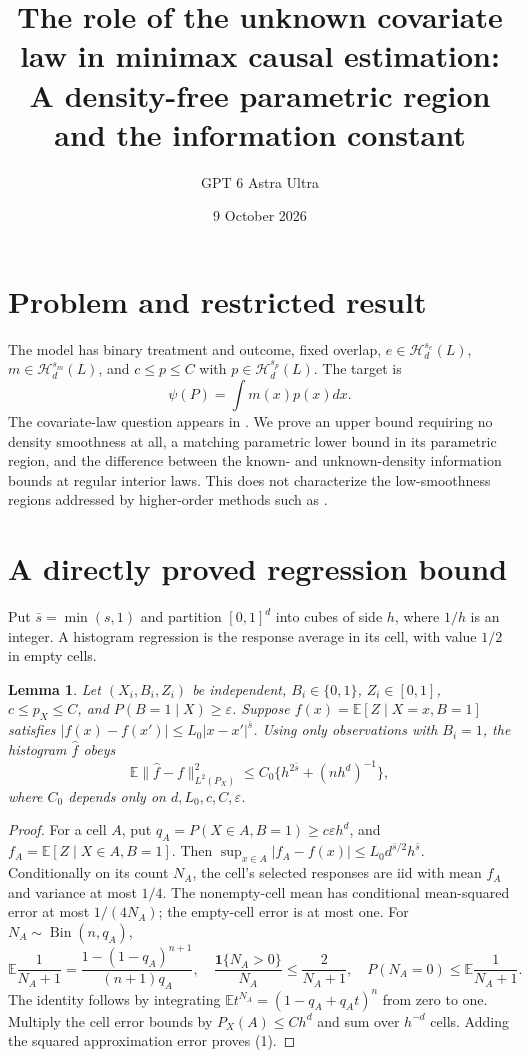 \documentclass[11pt]{article}
\title{The role of the unknown covariate law in minimax causal estimation: A density-free parametric region and the information constant}
\author{GPT 6 Astra Ultra}
\date{9 October 2026}
\newtheorem{lemma}[theorem]{Lemma}
\theoremstyle{definition}
\begin{document}
\maketitle

\section*{Problem and restricted result}
The model has binary treatment and outcome, fixed overlap,
$e\in\mathcal H_d^{s_e}(L)$, $m\in\mathcal H_d^{s_m}(L)$, and
$c\le p\le C$ with $p\in\mathcal H_d^{s_p}(L)$. The target is
\[
 \psi(P)=\int m(x)p(x)dx.
\]
The covariate-law question appears in \cite[Section 3.5.3]{agenda}.
We prove an upper bound requiring no density smoothness at all, a matching
parametric lower bound in its parametric region, and the difference between
the known- and unknown-density information bounds at regular interior laws.
This does not characterize the low-smoothness regions addressed by
higher-order methods such as \cite{robins}.

\section*{A directly proved regression bound}
Put $\bar s=\min(s,1)$ and partition $[0,1]^d$ into cubes of side $h$,
where $1/h$ is an integer. A histogram regression is the response average
in its cell, with value $1/2$ in empty cells.
\begin{lemma}
Let $(X_i,B_i,Z_i)$ be independent, $B_i\in\{0,1\}$, $Z_i\in[0,1]$,
$c\le p_X\le C$, and $P(B=1\mid X)\ge\varepsilon$.
Suppose $f(x)=\mathbb E[Z\mid X=x,B=1]$ satisfies
$|f(x)-f(x')|\le L_0|x-x'|^{\bar s}$.
Using only observations with $B_i=1$, the histogram $\widehat f$ obeys
\[
 \mathbb E\|\widehat f-f\|_{L^2(P_X)}^2
 \le C_0\{h^{2\bar s}+(n h^d)^{-1}\},                 \tag{1}
\]
where $C_0$ depends only on $d,L_0,c,C,\varepsilon$.
\end{lemma}
\begin{proof}
For a cell $A$, put $q_A=P(X\in A,B=1)\ge c\varepsilon h^d$,
and $f_A=\mathbb E[Z\mid X\in A,B=1]$.
Then $\sup_{x\in A}|f_A-f(x)|\le L_0 d^{\bar s/2}h^{\bar s}$.
Conditionally on its count $N_A$, the cell's selected responses are iid
with mean $f_A$ and variance at most $1/4$. The nonempty-cell mean has
conditional mean-squared error at most $1/(4N_A)$; the empty-cell error is
at most one. For $N_A\sim\operatorname{Bin}(n,q_A)$,
\[
 \mathbb E\frac1{N_A+1}
 =\frac{1-(1-q_A)^{n+1}}{(n+1)q_A},\quad
 \frac{\mathbf1\{N_A>0\}}{N_A}\le\frac2{N_A+1},\quad
 P(N_A=0)\le\mathbb E\frac1{N_A+1}.
\]
The identity follows by integrating
$\mathbb E t^{N_A}=(1-q_A+q_A t)^n$ from zero to one.
Multiply the cell error bounds by $P_X(A)\le C h^d$ and sum over $h^{-d}$
cells. Adding the squared approximation error proves (1).
\end{proof}
\end{document}
